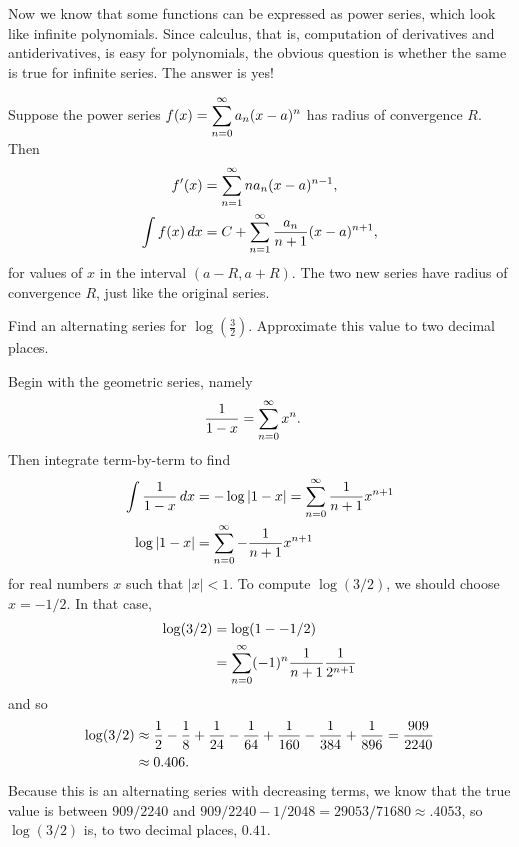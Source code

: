 \nobreak
Now we know that some functions can be expressed as power series,
which look like infinite polynomials. Since calculus, that is,
computation of derivatives and antiderivatives, is easy for
polynomials, the obvious question is whether the same is true
for infinite series. The answer is yes!

\begin{theorem} Suppose the power series $f(x)=\displaystyle\sum_{n=0}^\infty a_n(x-a)^n$ has
radius of convergence $R$. Then 
\begin{align*}
  f'(x)&=\sum_{n=1}^\infty na_n(x-a)^{n-1}, \\
  \int f(x)\,dx &= C+\sum_{n=1}^\infty {a_n\over n+1}(x-a)^{n+1}, \\
\end{align*}
for values of $x$ in the interval $(a-R,a+R)$.  The two new series
have radius of convergence $R$, just like the original series.
\end{theorem}


\begin{example}
  Find an alternating series for $\log \left(\frac{3}{2}\right)$.
  Approximate this value to two decimal places.
\end{example}

\begin{solution}
Begin with the geometric series, namely
\begin{align*}
  {1\over 1-x} &= \sum_{n=0}^\infty x^n.
\end{align*}
Then integrate term-by-term to find
\begin{align*}
  \int{1\over 1-x}\,dx &= -\log|1-x| = \sum_{n=0}^\infty {1\over
    n+1}x^{n+1} \\
  \log|1-x| &= \sum_{n=0}^\infty -{1\over n+1}x^{n+1} \\
\end{align*}
for real numbers $x$ such that $|x|<1$.  To compute $\log(3/2)$, we
should choose $x = -1/2$.  In that case,
\begin{align*}
  \log(3/2)&=\log(1--1/2) \\
  &= \sum_{n=0}^\infty (-1)^n{1\over n+1}{1\over 2^{n+1}}
\end{align*}
and so
\begin{align*}
  \log(3/2) &\approx {1\over 2}-{1\over 8}+{1\over 24}-{1\over 64}
  +{1\over 160}-{1\over 384}+{1\over 896} ={909\over 2240}\\
  &\approx 0.406.
\end{align*}
Because this is an alternating series with decreasing terms,
we know that the true value is between $909/2240$ and
$909/2240-1/2048=29053/71680\approx .4053$, so $\log(3/2)$ is, to two decimal
places, $0.41$. 
\end{solution}

